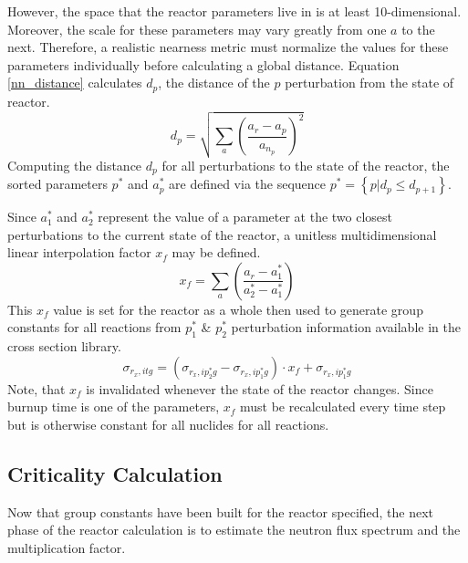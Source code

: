 However, the space that the reactor parameters live in is at least 10-dimensional.  Moreover, 
the scale for these parameters may vary greatly from one $a$ to the next.  Therefore, a realistic
nearness metric must normalize the values for these parameters individually before calculating a
global distance.  Equation \ref{nn_distance} calculates $d_p$, the distance of the $p$ 
perturbation from the state of reactor.
\begin{equation}
\label{nn_distance}
d_p = \sqrt{\sum_a \left(\frac{a_r - a_p}{a_{n_p}}\right)^2}
\end{equation}
Computing the distance $d_p$ for all perturbations to the state of the reactor, 
the sorted parameters $p^*$ and $a_p^*$ are defined via the sequence $p^* = \left\{p | d_p \le d_{p+1}\right\}$.

Since $a_1^*$ and $a_2^*$ represent the value of a parameter at the two closest perturbations to the
current state of the reactor, a unitless multidimensional linear interpolation factor $x_f$ may be defined.
\begin{equation}
\label{x_factor}
x_f = \sum_a \left(\frac{a_r - a_1^*}{a_2^* - a_1^*}\right)
\end{equation}
This $x_f$ value is set for the reactor as a whole then used to generate group constants for 
all reactions from $p_1^*$ \& $p_2^*$ perturbation information available in the cross section library. 
\begin{equation}
\label{sig_multi_interp}
\sigma_{r_x,itg} = (\sigma_{r_x,ip_2^*g} - \sigma_{r_x,ip_1^*g}) \cdot x_f  + \sigma_{r_x,ip_1^*g}
\end{equation}
Note, that $x_f$ is invalidated whenever the state of the reactor changes.  Since burnup time is one of 
the parameters, $x_f$ must be recalculated every time step but is otherwise constant for all nuclides
for all reactions.


\subsection{Criticality Calculation}
\label{mg_sec:crit_calc}
Now that group constants have been built for the reactor specified, the next phase of the reactor 
calculation is to estimate the neutron flux spectrum and the multiplication factor. 

